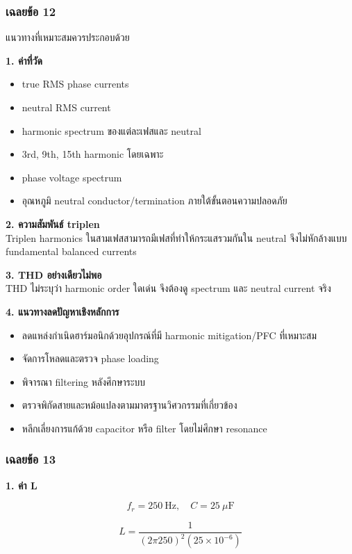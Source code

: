\subsubsection{เฉลยข้อ 12}

แนวทางที่เหมาะสมควรประกอบด้วย

\textbf{1. ค่าที่วัด}

\begin{itemize}
    \item true RMS phase currents
    \item neutral RMS current
    \item harmonic spectrum ของแต่ละเฟสและ neutral
    \item 3rd, 9th, 15th harmonic โดยเฉพาะ
    \item phase voltage spectrum
    \item อุณหภูมิ neutral conductor/termination ภายใต้ขั้นตอนความปลอดภัย
\end{itemize}

\textbf{2. ความสัมพันธ์ triplen} \\
Triplen harmonics ในสามเฟสสามารถมีเฟสที่ทำให้กระแสรวมกันใน neutral จึงไม่หักล้างแบบ fundamental balanced currents

\textbf{3. THD อย่างเดียวไม่พอ} \\
THD ไม่ระบุว่า harmonic order ใดเด่น จึงต้องดู spectrum และ neutral current จริง

\textbf{4. แนวทางลดปัญหาเชิงหลักการ}

\begin{itemize}
    \item ลดแหล่งกำเนิดฮาร์มอนิกด้วยอุปกรณ์ที่มี harmonic mitigation/PFC ที่เหมาะสม
    \item จัดการโหลดและตรวจ phase loading
    \item พิจารณา filtering หลังศึกษาระบบ
    \item ตรวจพิกัดสายและหม้อแปลงตามมาตรฐานวิศวกรรมที่เกี่ยวข้อง
    \item หลีกเลี่ยงการแก้ด้วย capacitor หรือ filter โดยไม่ศึกษา resonance
\end{itemize}

\subsubsection{เฉลยข้อ 13}

\textbf{1. ค่า L}

\[
f_r=250\ \text{Hz},\quad C=25\ \mu\text{F}
\]

\[
L=\frac{1}{(2\pi250)^2(25\times10^{-6})}
\]

